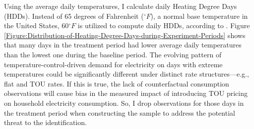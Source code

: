 Using the average daily temperatures, I calculate daily Heating Degree Days (HDDs). Instead of 65 degrees of Fahrenheit ($^{\circ}F$), a normal base temperature in the United States, 60$^{\circ}F$ is utilized to compute daily HDDs, according to \cite{The-Impacts-of-Climate-Change-on-Domestic-Natural-Gas-Consumption-in-the-Greater-Dublin-Region_Liu-and-Sweeney_2012}. Figure \ref{Figure:Distribution-of-Heating-Degree-Days-during-Experiment-Periods} shows that many days in the treatment period had lower average daily temperatures than the lowest one during the baseline period. The evolving pattern of temperature-control-driven demand for electricity on days with extreme temperatures could be significantly different under distinct rate structures---e.g., flat and TOU rates. If this is true, the lack of counterfactual consumption observations will cause bias in the measured impact of introducing TOU pricing on household electricity consumption. So, I drop observations for those days in the treatment period when constructing the sample to address the potential threat to the identification. 
